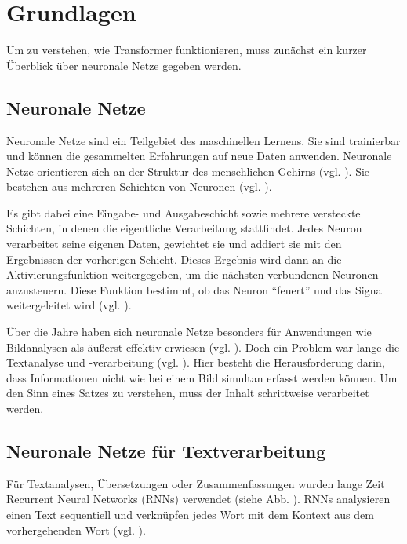 \chapter{Grundlagen}

Um zu verstehen, wie Transformer funktionieren, muss zunächst ein kurzer Überblick über neuronale Netze gegeben werden.  

\section{Neuronale Netze}

Neuronale Netze sind ein Teilgebiet des maschinellen Lernens.
Sie sind trainierbar und können die gesammelten Erfahrungen auf neue Daten anwenden.  
Neuronale Netze orientieren sich an der Struktur des menschlichen Gehirns (vgl. \cite[S. 14]{Kinnebrock.2018}).  
Sie bestehen aus mehreren Schichten von Neuronen (vgl. \cite[S. 25]{Kinnebrock.2018}).  

Es gibt dabei eine Eingabe- und Ausgabeschicht sowie mehrere versteckte Schichten, in denen die eigentliche Verarbeitung stattfindet.  
Jedes Neuron verarbeitet seine eigenen Daten, gewichtet sie und addiert sie mit den Ergebnissen der vorherigen Schicht.  
Dieses Ergebnis wird dann an die Aktivierungsfunktion weitergegeben, um die nächsten verbundenen Neuronen anzusteuern.  
Diese Funktion bestimmt, ob das Neuron \enquote{feuert} und das Signal weitergeleitet wird (vgl. \cite[S. 14]{Kinnebrock.2018}).  

Über die Jahre haben sich neuronale Netze besonders für Anwendungen wie Bildanalysen als äußerst effektiv erwiesen (vgl. \cite[S. 16]{paass.2020}).  
Doch ein Problem war lange die Textanalyse und -verarbeitung (vgl. \cite[S. 22]{paass.2020}).
Hier besteht die Herausforderung darin, dass Informationen nicht wie bei einem Bild simultan erfasst werden können.  
Um den Sinn eines Satzes zu verstehen, muss der Inhalt schrittweise verarbeitet werden.  

\section{Neuronale Netze für Textverarbeitung}

Für Textanalysen, Übersetzungen oder Zusammenfassungen wurden lange Zeit Recurrent Neural Networks (RNNs) verwendet (siehe Abb. ).  
RNNs analysieren einen Text sequentiell und verknüpfen jedes Wort mit dem Kontext aus dem vorhergehenden Wort (vgl. \cite[S. 2]{attention}).


